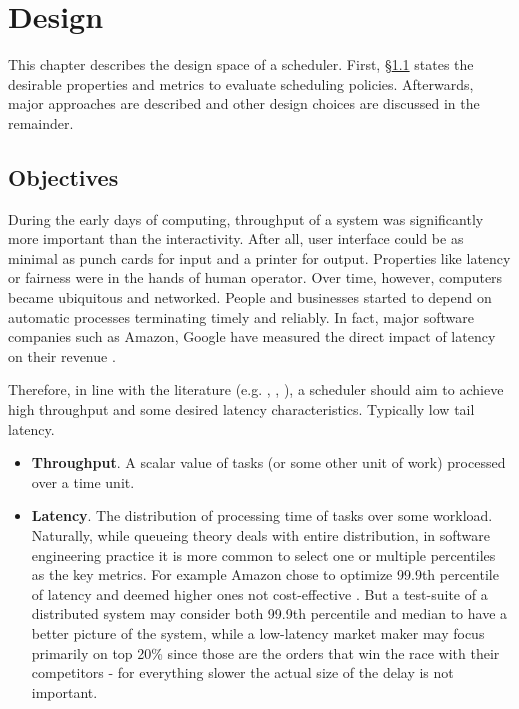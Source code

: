 \documentclass[12pt,a4paper,twoside]{report}
\begin{document}
\chapter{Design}
This chapter describes the design space of a scheduler. First, \S\ref{section:objectives} states the desirable properties and metrics to evaluate scheduling policies. Afterwards, major approaches are described and other design choices are discussed in the remainder. 

\section{Objectives}
\label{section:objectives}
During the early days of computing, throughput of a system was significantly more important than the interactivity. After all, user interface could be as minimal as punch cards for input and a printer for output. Properties like latency or fairness were in the hands of human operator. Over time, however, computers became ubiquitous and networked. People and businesses started to depend on automatic processes terminating timely and reliably. In fact, major software companies such as Amazon, Google have measured the direct impact of latency on their revenue \cite{Kleppmann2017-en}.

Therefore, in line with the literature (e.g. \cite{8057206}, \cite{latthrough}, \cite{Sun2021}), a scheduler should aim to achieve high throughput and some desired latency characteristics. Typically low tail latency.
\begin{itemize}
    \item \textbf{Throughput}. A scalar value of tasks (or some other unit of work) processed over a time unit.
    \item \textbf{Latency}. The distribution of processing time of tasks over some workload. Naturally, while queueing theory deals with entire distribution, in software engineering practice it is more common to select one or multiple percentiles as the key metrics. For example Amazon chose to optimize 99.9th percentile of latency and deemed higher ones not cost-effective \cite{Kleppmann2017-en}. But a test-suite of a distributed system may consider both 99.9th percentile and median to have a better picture of the system, while a low-latency market maker may focus primarily on top 20\% since those are the orders that win the race with their competitors - for everything slower the actual size of the delay is not important. 
\end{itemize}
\end{document}

